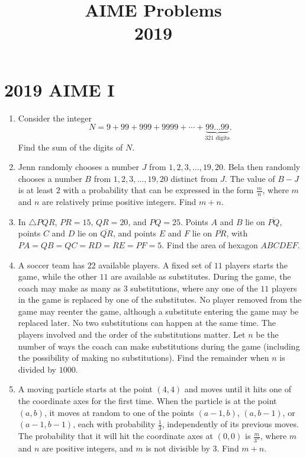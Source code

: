 \documentclass{article}
\title{AIME Problems \\ 2019}
\date{}
\begin{document}
\maketitle\thispagestyle{fancy}\newpage\section*{2019 AIME I}
\begin{enumerate}[label=\arabic*., itemsep=0.5em]
\item Consider the integer 
\begin{equation*}
N = 9 + 99 + 999 + 9999 + \cdots + \underbrace{99\ldots 99}_\text{321 digits}.
\end{equation*}
Find the sum of the digits of \(N\).\par \vspace{0.5em}\item Jenn randomly chooses a number \(J\) from \(1, 2, 3,\ldots, 19, 20\). Bela then randomly chooses a number \(B\) from \(1, 2, 3,\ldots, 19, 20\) distinct from \(J\). The value of \(B - J\) is at least \(2\) with a probability that can be expressed in the form \(\tfrac{m}{n}\), where \(m\) and \(n\) are relatively prime positive integers. Find \(m+n\).\par \vspace{0.5em}\item In \(\triangle PQR\), \(PR=15\), \(QR=20\), and \(PQ=25\). Points \(A\) and \(B\) lie on \(\overline{PQ}\), points \(C\) and \(D\) lie on \(\overline{QR}\), and points \(E\) and \(F\) lie on \(\overline{PR}\), with \(PA=QB=QC=RD=RE=PF=5\). Find the area of hexagon \(ABCDEF\).\par \vspace{0.5em}\item A soccer team has \(22\) available players. A fixed set of \(11\) players starts the game, while the other \(11\) are available as substitutes. During the game, the coach may make as many as \(3\) substitutions, where any one of the \(11\) players in the game is replaced by one of the substitutes. No player removed from the game may reenter the game, although a substitute entering the game may be replaced later. No two substitutions can happen at the same time. The players involved and the order of the substitutions matter. Let \(n\) be the number of ways the coach can make substitutions during the game (including the possibility of making no substitutions). Find the remainder when \(n\) is divided by \(1000\).\par \vspace{0.5em}\item A moving particle starts at the point \((4,4)\) and moves until it hits one of the coordinate axes for the first time. When the particle is at the point \((a,b)\), it moves at random to one of the points \((a-1,b)\), \((a,b-1)\), or \((a-1,b-1)\), each with probability \(\tfrac{1}{3}\), independently of its previous moves. The probability that it will hit the coordinate axes at \((0,0)\) is \(\tfrac{m}{3^n}\), where \(m\) and \(n\) are positive integers, and \(m\) is not divisible by \(3\). Find \(m + n\).\par 
\end{enumerate}
\end{document}
